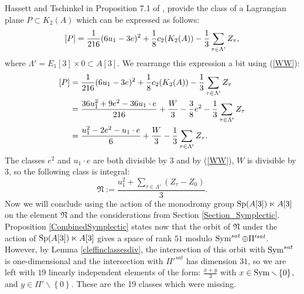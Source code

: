 Hassett and Tschinkel in Proposition 7.1 of \cite{Hassett}, provide the class of a Lagrangian plane $P\subset K_2(A)$ which can be expressed as follows:
$$\left[P\right]=\frac{1}{216}(6u_1-3e)^2+\frac{1}{8}c_2(K_{ 2 }( A ))-\frac{1}{3}\sum_{\tau\in \Lambda'} Z_{\tau},$$
where $\Lambda'=E_1[3]\times 0\subset A[3]$. We rearrange this expression a bit using (\ref{WW}):
\begin{align*}
\left[P\right]&=\frac{1}{216}(6u_1-3e)^2+\frac{1}{8}c_2(K_{ 2 }( A ))-\frac{1}{3}\sum_{\tau\in \Lambda'} Z_{\tau}\\
&=\frac{36u_1^2+9e^2-36u_1\cdot e}{216} +\frac{W}{3}-\frac{3}{8}e^2-\frac{1}{3}\sum_{\tau\in \Lambda'} Z_{\tau}\\
&=\frac{u_1^2-2e^2-u_1\cdot e}{6} +\frac{W}{3}-\frac{1}{3}\sum_{\tau\in \Lambda'} Z_{\tau}.
\end{align*}
The classes $e^2$ and $u_1\cdot e$ are both divisible by 3 and by (\ref{WW}), $W$ is divisible by 3, so the following class is integral:
$$
\mathfrak{N}:=\frac{u_1^2+\sum_{\tau\in \Lambda'} (Z_{\tau}-Z_0)}{3}
.
$$
Now we will conclude using the action of the monodromy group $\operatorname{Sp}(A[3])\ltimes A[3]$ on the element $\mathfrak{N}$ and the considerations from Section \ref{Section_Symplectic}. 
Proposition \ref{CombinedSymplectic} states now that
the orbit of $\mathfrak{N}$ under the action of $\operatorname{Sp}(A[3])\ltimes A[3]$ gives a space of rank $51$ modulo $\operatorname{Sym}^{sat}\oplus\Pi'^{sat}$. However, by Lemma \ref{cleffinclassesdiv}, the intersection of this orbit with $\operatorname{Sym}^{sat}$ is one-dimensional and the intersection with $\Pi'^{sat}$ has dimension $31$, so we are left with $19$ linearly independent elements of the form:
$\frac{x+y}{3}$ with $x\in \operatorname{Sym}\smallsetminus \left\{0\right\}$, and $y\in \Pi'\smallsetminus \left\{0\right\}$. These are the 19 classes which were missing. 

